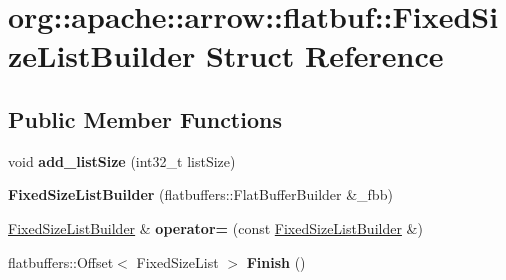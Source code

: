 \hypertarget{structorg_1_1apache_1_1arrow_1_1flatbuf_1_1FixedSizeListBuilder}{}\section{org\+:\+:apache\+:\+:arrow\+:\+:flatbuf\+:\+:Fixed\+Size\+List\+Builder Struct Reference}
\label{structorg_1_1apache_1_1arrow_1_1flatbuf_1_1FixedSizeListBuilder}
\subsection*{Public Member Functions}
\begin{DoxyCompactItemize}
\item 
void {\bfseries add\+\_\+list\+Size} (int32\+\_\+t list\+Size)\hypertarget{structorg_1_1apache_1_1arrow_1_1flatbuf_1_1FixedSizeListBuilder_ae362c3efa83702642914a2959e6fb46f}{}\label{structorg_1_1apache_1_1arrow_1_1flatbuf_1_1FixedSizeListBuilder_ae362c3efa83702642914a2959e6fb46f}

\item 
{\bfseries Fixed\+Size\+List\+Builder} (flatbuffers\+::\+Flat\+Buffer\+Builder \&\+\_\+fbb)\hypertarget{structorg_1_1apache_1_1arrow_1_1flatbuf_1_1FixedSizeListBuilder_ad447aea6322bda6a33b570cab380a8f8}{}\label{structorg_1_1apache_1_1arrow_1_1flatbuf_1_1FixedSizeListBuilder_ad447aea6322bda6a33b570cab380a8f8}

\item 
\hyperlink{structorg_1_1apache_1_1arrow_1_1flatbuf_1_1FixedSizeListBuilder}{Fixed\+Size\+List\+Builder} \& {\bfseries operator=} (const \hyperlink{structorg_1_1apache_1_1arrow_1_1flatbuf_1_1FixedSizeListBuilder}{Fixed\+Size\+List\+Builder} \&)\hypertarget{structorg_1_1apache_1_1arrow_1_1flatbuf_1_1FixedSizeListBuilder_a0492a423d0fae6836b19cd01dd1e3e92}{}\label{structorg_1_1apache_1_1arrow_1_1flatbuf_1_1FixedSizeListBuilder_a0492a423d0fae6836b19cd01dd1e3e92}

\item 
flatbuffers\+::\+Offset$<$ Fixed\+Size\+List $>$ {\bfseries Finish} ()\hypertarget{structorg_1_1apache_1_1arrow_1_1flatbuf_1_1FixedSizeListBuilder_a36f92b77f20b65967bce6b08eacecdaf}{}\label{structorg_1_1apache_1_1arrow_1_1flatbuf_1_1FixedSizeListBuilder_a36f92b77f20b65967bce6b08eacecdaf}

\end{DoxyCompactItemize}
